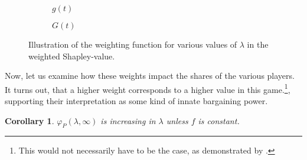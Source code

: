 \documentclass[a4paper]{article}
\newtheorem{corollary}{Corollary}
\begin{document}
\begin{figure}[ht]
    \centering
    \begin{subfigure}[b]{0.45\textwidth}
        \centering
        \caption{$g(t)$}
    \end{subfigure}
    \begin{subfigure}[b]{0.45\textwidth}
        \centering
        \caption{$G(t)$}
    \end{subfigure}
    \caption{Illustration of the weighting function for various values of $\lambda$ in the weighted Shapley-value.}
    \label{fig:weigh_function}
\end{figure}

Now, let us examine how these weights impact the shares of the various players.
It turns out, that a higher weight corresponds to a higher value in this game.\footnote{
    This would not necessarily have to be the case, as demonstrated by \textcite{owen1968communications}.
},
supporting their interpretation as some kind of innate bargaining power.
\begin{corollary}
    \label{cor:platform_value_weighted}
    $\varphi_P(\lambda, \infty)$ is increasing in $\lambda$ unless $f$ is constant.
\end{corollary}
\end{document}
